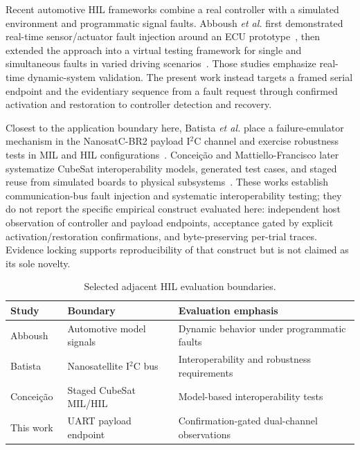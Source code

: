 \documentclass[conference]{IEEEtran}
\begin{document}
Recent automotive HIL frameworks combine a real controller with a simulated environment and programmatic signal faults. Abboush \emph{et al.} first demonstrated real-time sensor/actuator fault injection around an ECU prototype~\cite{abboush2022}, then extended the approach into a virtual testing framework for single and simultaneous faults in varied driving scenarios~\cite{abboush2024}. Those studies emphasize real-time dynamic-system validation. The present work instead targets a framed serial endpoint and the evidentiary sequence from a fault request through confirmed activation and restoration to controller detection and recovery.

Closest to the application boundary here, Batista \emph{et al.} place a failure-emulator mechanism in the NanosatC-BR2 payload I$^2$C channel and exercise robustness tests in MIL and HIL configurations~\cite{batista2019}. Concei\c{c}\~ao and Mattiello-Francisco later systematize CubeSat interoperability models, generated test cases, and staged reuse from simulated boards to physical subsystems~\cite{conceicao2025}. These works establish communication-bus fault injection and systematic interoperability testing; they do not report the specific empirical construct evaluated here: independent host observation of controller and payload endpoints, acceptance gated by explicit activation/restoration confirmations, and byte-preserving per-trial traces. Evidence locking supports reproducibility of that construct but is not claimed as its sole novelty.

\begin{table}[t]
\caption{Selected adjacent HIL evaluation boundaries.}
\label{tab:related}
\centering
\scriptsize
\begin{tabular}{@{}>{\raggedright\arraybackslash}p{1.45cm}>{\raggedright\arraybackslash}p{2.0cm}>{\raggedright\arraybackslash}p{3.65cm}@{}}
\toprule
Study & Boundary & Evaluation emphasis \\
\midrule
Abboush~\cite{abboush2022,abboush2024} & Automotive model signals & Dynamic behavior under programmatic faults \\
Batista~\cite{batista2019} & Nanosatellite I$^2$C bus & Interoperability and robustness requirements \\
Concei\c{c}\~ao~\cite{conceicao2025} & Staged CubeSat MIL/HIL & Model-based interoperability tests \\
This work & UART payload endpoint & Confirmation-gated dual-channel observations \\
\bottomrule
\end{tabular}
\end{table}
\end{document}
